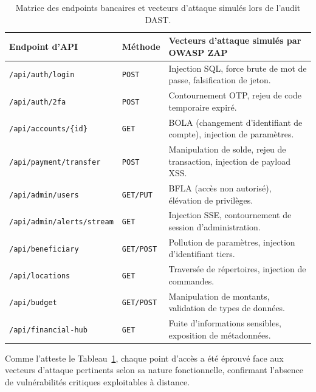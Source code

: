 \begin{table}[!htbp]
\centering
\small
\begin{tabular}{|l|l|p{6.5cm}|}
\hline
\textbf{Endpoint d'API} & \textbf{Méthode} & \textbf{Vecteurs d'attaque simulés par OWASP ZAP} \\ \hline
\texttt{/api/auth/login} & \texttt{POST} & Injection SQL, force brute de mot de passe, falsification de jeton. \\ \hline
\texttt{/api/auth/2fa} & \texttt{POST} & Contournement OTP, rejeu de code temporaire expiré. \\ \hline
\texttt{/api/accounts/\{id\}} & \texttt{GET} & BOLA (changement d'identifiant de compte), injection de paramètres. \\ \hline
\texttt{/api/payment/transfer} & \texttt{POST} & Manipulation de solde, rejeu de transaction, injection de payload XSS. \\ \hline
\texttt{/api/admin/users} & \texttt{GET/PUT} & BFLA (accès non autorisé), élévation de privilèges. \\ \hline
\texttt{/api/admin/alerts/stream} & \texttt{GET} & Injection SSE, contournement de session d'administration. \\ \hline
\texttt{/api/beneficiary} & \texttt{GET/POST} & Pollution de paramètres, injection d'identifiant tiers. \\ \hline
\texttt{/api/locations} & \texttt{GET} & Traversée de répertoires, injection de commandes. \\ \hline
\texttt{/api/budget} & \texttt{GET/POST} & Manipulation de montants, validation de types de données. \\ \hline
\texttt{/api/financial-hub} & \texttt{GET} & Fuite d'informations sensibles, exposition de métadonnées. \\ \hline
\end{tabular}
\caption{Matrice des endpoints bancaires et vecteurs d'attaque simulés lors de l'audit DAST.}
\label{tab:annexe_zap_matrix}
\end{table}

Comme l'atteste le Tableau~\ref{tab:annexe_zap_matrix}, chaque point d'accès a été éprouvé face aux vecteurs d'attaque pertinents selon sa nature fonctionnelle, confirmant l'absence de vulnérabilités critiques exploitables à distance.

